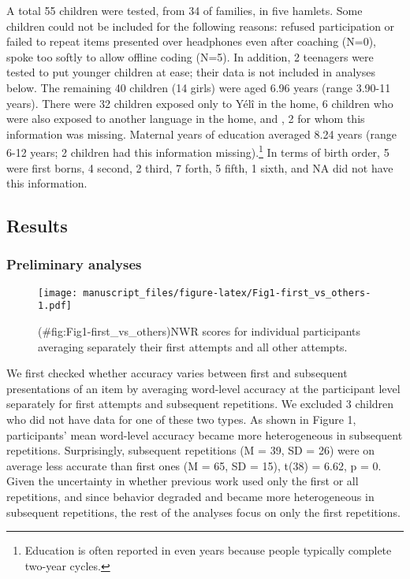 \documentclass[english,,man,floatsintext]{apa6}
\begin{document}
A total 55 children were tested, from 34 of families, in five hamlets.
Some children could not be included for the following reasons: refused
participation or failed to repeat items presented over headphones even
after coaching (N=0), spoke too softly to allow offline coding (N=5). In
addition, 2 teenagers were tested to put younger children at ease; their
data is not included in analyses below. The remaining 40 children (14
girls) were aged 6.96 years (range 3.90-11 years). There were 32
children exposed only to Yélî in the home, 6 children who were also
exposed to another language in the home, and , 2 for whom this
information was missing. Maternal years of education averaged 8.24 years
(range 6-12 years; 2 children had this information missing).\footnote{Education
  is often reported in even years because people typically complete
  two-year cycles.} In terms of birth order, 5 were first borns, 4
second, 2 third, 7 forth, 5 fifth, 1 sixth, and NA did not have this
information.

\subsection{Results}\label{results}

\subsubsection{Preliminary analyses}\label{preliminary-analyses}

\begin{figure}
\centering
\texttt{[image: manuscript\_files/figure-latex/Fig1-first\_vs\_others-1.pdf]}
\caption{(\#fig:Fig1-first\_vs\_others)NWR scores for individual
participants averaging separately their first attempts and all other
attempts.}
\end{figure}

We first checked whether accuracy varies between first and subsequent
presentations of an item by averaging word-level accuracy at the
participant level separately for first attempts and subsequent
repetitions. We excluded 3 children who did not have data for one of
these two types. As shown in Figure 1, participants' mean word-level
accuracy became more heterogeneous in subsequent repetitions.
Surprisingly, subsequent repetitions (M = 39, SD = 26) were on average
less accurate than first ones (M = 65, SD = 15), t(38) = 6.62, p = 0.
Given the uncertainty in whether previous work used only the first or
all repetitions, and since behavior degraded and became more
heterogeneous in subsequent repetitions, the rest of the analyses focus
on only the first repetitions.
\end{document}
